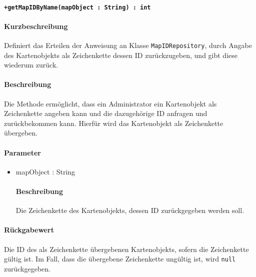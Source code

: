\paragraph*{\texttt{+getMapIDByName(mapObject : String) : int}}%
\paragraph*{Kurzbeschreibung}
Definiert das Erteilen der Anweisung an Klasse \texttt{MapIDRepository}, durch Angabe des Kartenobjekts als Zeichenkette dessen ID zurückzugeben, und gibt diese wiederum zurück.
\paragraph*{Beschreibung}
Die Methode ermöglicht, dass ein Administrator ein Kartenobjekt als Zeichenkette angeben kann und die dazugehörige ID anfragen und zurückbekommen kann.
Hierfür wird das Kartenobjekt als Zeichenkette übergeben.
\paragraph*{Parameter}
\begin{itemize}
    \item mapObject : String
    		\paragraph*{Beschreibung}
    		Die Zeichenkette des Kartenobjekts, dessen ID zurückgegeben werden soll.
\end{itemize}
\paragraph*{Rückgabewert}
Die ID des als Zeichenkette übergebenen Kartenobjekts, sofern die Zeichenkette gültig ist.
Im Fall, dass die übergebene Zeichenkette ungültig ist, wird \texttt{null} zurückgegeben.
